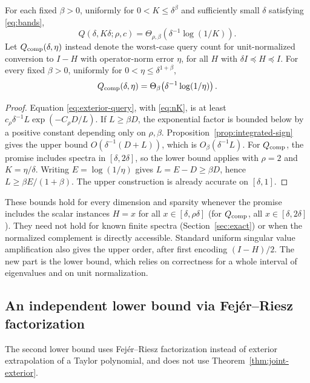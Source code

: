 \begin{theorem}\label{thm:joint-matched}
For each fixed $\beta>0$, uniformly for $0<K\leq\delta^\beta$ and sufficiently small $\delta$ satisfying \eqref{eq:bands},
\begin{equation}\label{eq:matched-shift}
 Q(\delta,K\delta;\rho,c)
 =\Theta_{\rho,\beta}\!\left(\delta^{-1}\log(1/K)\right).
\end{equation}
Let $Q_{\rm comp}(\delta,\eta)$ instead denote the worst-case query count for unit-normalized conversion to $I-H$ with operator-norm error $\eta$, for all $H$ with $\delta I\preceq H\preceq I$. For every fixed $\beta>0$, uniformly for $0<\eta\leq\delta^{1+\beta}$,
\begin{equation}\label{eq:matched-complement}
 Q_{\rm comp}(\delta,\eta)
 =\Theta_\beta\!\left(\delta^{-1}\log(1/\eta)\right).
\end{equation}
\end{theorem}
\begin{proof}
Equation \eqref{eq:exterior-query}, with \eqref{eq:nK}, is at least
$c_\rho\delta^{-1}L\exp(-C_\rho D/L)$. If $L\geq\beta D$, the exponential factor is bounded below by a positive constant depending only on $\rho,\beta$. Proposition~\ref{prop:integrated-sign} gives the upper bound $O(\delta^{-1}(D+L))$, which is $O_\beta(\delta^{-1}L)$. For $Q_{\rm comp}$, the promise includes spectra in $[\delta,2\delta]$, so the lower bound applies with $\rho=2$ and $K=\eta/\delta$. Writing $E=\log(1/\eta)$ gives $L=E-D\geq\beta D$, hence $L\geq\beta E/(1+\beta)$. The upper construction is already accurate on $[\delta,1]$.
\end{proof}
These bounds hold for every dimension and sparsity whenever the promise includes the scalar instances $H=x$ for all $x\in[\delta,\rho\delta]$ (for $Q_{\rm comp}$, all $x\in[\delta,2\delta]$). They need not hold for known finite spectra (Section~\ref{sec:exact}) or when the normalized complement is directly accessible. Standard uniform singular value amplification \cite[Theorem 30, extended version]{gilyen2019} also gives the upper order, after first encoding $(I-H)/2$. The new part is the lower bound, which relies on correctness for a whole interval of eigenvalues and on unit normalization.

\subsection{An independent lower bound via Fej\'er--Riesz factorization}
The second lower bound uses Fej\'er--Riesz factorization instead of exterior extrapolation of a Taylor polynomial, and does not use Theorem~\ref{thm:joint-exterior}.

